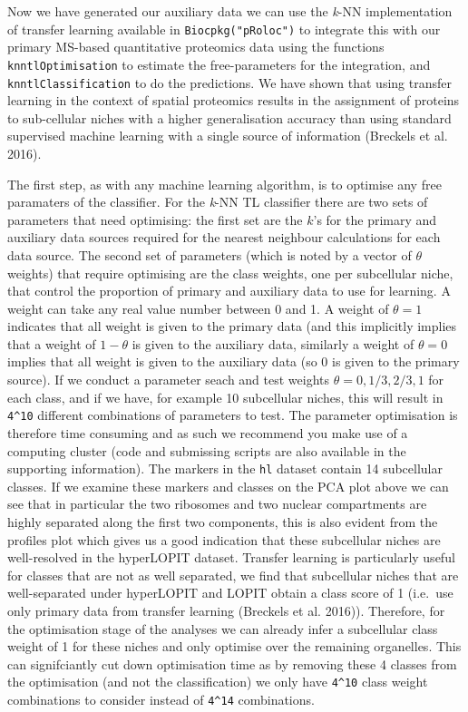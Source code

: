 Now we have generated our auxiliary data we can use the \emph{k}-NN
implementation of transfer learning available in
\texttt{Biocpkg("pRoloc")} to integrate this with our primary MS-based
quantitative proteomics data using the functions
\texttt{knntlOptimisation} to estimate the free-parameters for the
integration, and \texttt{knntlClassification} to do the predictions. We
have shown that using transfer learning in the context of spatial
proteomics results in the assignment of proteins to sub-cellular niches
with a higher generalisation accuracy than using standard supervised
machine learning with a single source of information (Breckels et al.
2016).

The first step, as with any machine learning algorithm, is to optimise
any free paramaters of the classifier. For the \emph{k}-NN TL classifier
there are two sets of parameters that need optimising: the first set are
the $k$'s for the primary and auxiliary data sources required for the
nearest neighbour calculations for each data source. The second set of
parameters (which is noted by a vector of $\theta$ weights) that require
optimising are the class weights, one per subcellular niche, that
control the proportion of primary and auxiliary data to use for
learning. A weight can take any real value number between 0 and 1. A
weight of $\theta = 1$ indicates that all weight is given to the primary
data (and this implicitly implies that a weight of $1 - \theta$ is given
to the auxiliary data, similarly a weight of $\theta = 0$ implies that
all weight is given to the auxiliary data (so 0 is given to the primary
source). If we conduct a parameter seach and test weights
$\theta = {0, 1/3, 2/3, 1}$ for each class, and if we have, for example
10 subcellular niches, this will result in \texttt{4\^{}10} different
combinations of parameters to test. The parameter optimisation is
therefore time consuming and as such we recommend you make use of a
computing cluster (code and submissing scripts are also available in the
supporting information). The markers in the \texttt{hl} dataset contain
14 subcellular classes. If we examine these markers and classes on the
PCA plot above we can see that in particular the two ribosomes and two
nuclear compartments are highly separated along the first two
components, this is also evident from the profiles plot which gives us a
good indication that these subcellular niches are well-resolved in the
hyperLOPIT dataset. Transfer learning is particularly useful for classes
that are not as well separated, we find that subcellular niches that are
well-separated under hyperLOPIT and LOPIT obtain a class score of 1
(i.e.~use only primary data from transfer learning (Breckels et al.
2016)). Therefore, for the optimisation stage of the analyses we can
already infer a subcellular class weight of 1 for these niches and only
optimise over the remaining organelles. This can signifciantly cut down
optimisation time as by removing these 4 classes from the optimisation
(and not the classification) we only have \texttt{4\^{}10} class weight
combinations to consider instead of \texttt{4\^{}14} combinations.

